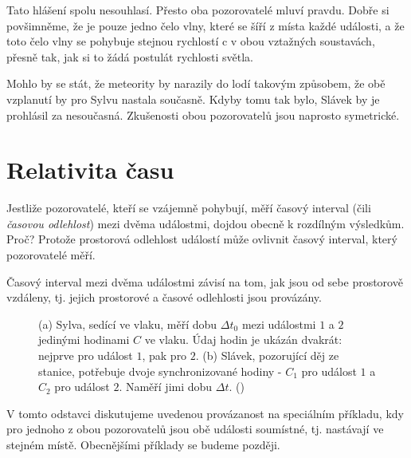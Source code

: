       Tato hlášení spolu nesouhlasí. Přesto oba pozorovatelé mluví pravdu. Dobře si povšimněme, že
      je pouze jedno čelo vlny, které se šíří z místa každé události, a že toto čelo vlny se
      pohybuje stejnou rychlostí c v obou vztažných soustavách, přesně tak, jak si to žádá postulát
      rychlosti světla.

      Mohlo by se stát, že meteority by narazily do lodí takovým způsobem, že obě vzplanutí by pro
      Sylvu nastala současně. Kdyby tomu tak bylo, Slávek by je prohlásil za nesoučasná. Zkušenosti
      obou pozorovatelů jsou naprosto symetrické.
  
  \section{Relativita času}
    Jestliže pozorovatelé, kteří se vzájemně pohybují, měří časový interval (čili \emph{časovou
    odlehlost}) mezi dvěma událostmi, dojdou obecně k rozdílným výsledkům. Proč? Protože prostorová
    odlehlost událostí může ovlivnit časový interval, který pozorovatelé měří.  
    
    \begin{mdframed}[style=mdmathdef] 
      Časový interval mezi dvěma událostmi závisí na tom, jak jsou od sebe prostorově vzdáleny, tj.
      jejich prostorové a časové odlehlosti jsou provázány.
    \end{mdframed}

    \begin{figure}[ht!]  %
      \centering
         \newline    
      \caption{(a) Sylva, sedící ve vlaku, měří dobu \(\Delta t_0\) mezi událostmi \(1\) a \(2\)
        jedinými hodinami \(C\) ve vlaku. Údaj hodin je ukázán dvakrát: nejprve pro událost \(1\),
        pak pro \(2\). (b) Slávek, pozorující děj ze stanice, potřebuje dvoje synchronizované hodiny
        - \(C_1\) pro událost \(1\) a \(C_2\) pro událost \(2\). Naměří jimi dobu \(\Delta t\).
        (\cite[s.~1011]{Halliday2001})}
      \label{fyz:fig912}
    \end{figure}

    V tomto odstavci diskutujeme uvedenou provázanost na speciálním příkladu, kdy pro jednoho z obou
    pozorovatelů jsou obě události soumístné, tj. nastávají ve stejném místě. Obecnějšími příklady
    se budeme později.

